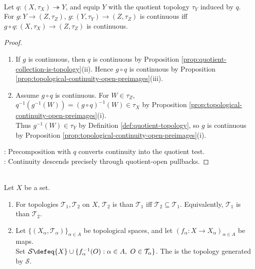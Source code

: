 \begin{proposition} \label{prop:quotient-topology-universal-property} \\
Let $q:(X,\tau_X)\twoheadrightarrow Y$, and equip $Y$ with the quotient topology $\tau_Y$ induced by $q$.\\
For $g:Y\to(Z,\tau_Z)$, $g:(Y,\tau_Y)\to(Z,\tau_Z)$ is continuous iff $g\circ q:(X,\tau_X)\to(Z,\tau_Z)$ is continuous.
\begin{proof}
\begin{enumerate}[label=\roman*.]
\setlength{\itemsep}{0pt}
\item[$(\Rightarrow)$] If $g$ is continuous, then $q$ is continuous by Proposition \ref{prop:quotient-collection-is-topology}(ii). Hence $g\circ q$ is continuous by Proposition \ref{prop:topological-continuity-open-preimages}(iii).
\item[$(\Leftarrow)$] Assume $g\circ q$ is continuous. For $W\in\tau_Z$, $q^{-1}(g^{-1}(W))=(g\circ q)^{-1}(W)\in\tau_X$ by Proposition \ref{prop:topological-continuity-open-preimages}(i).\\
Thus $g^{-1}(W)\in\tau_Y$ by Definition \ref{def:quotient-topology}, so $g$ is continuous by Proposition \ref{prop:topological-continuity-open-preimages}(i).
\end{enumerate}
: Precomposition with $q$ converts continuity into the quotient test.\\
: Continuity descends precisely through quotient-open pullbacks.
\end{proof}
\end{proposition}

\begin{definition} \label{def:weak-topology-induced-by-maps} \\
Let $X$ be a set.
\begin{enumerate}[label=(\roman*)]
\setlength{\itemsep}{0pt}
\item For topologies $\mathcal{T}_1,\mathcal{T}_2$ on $X$, $\mathcal{T}_2$ is  than $\mathcal{T}_1$ iff $\mathcal{T}_2\subseteq\mathcal{T}_1$. Equivalently, $\mathcal{T}_1$ is  than $\mathcal{T}_2$.
\item Let $\{(X_\alpha,\mathcal{T}_\alpha)\}_{\alpha\in A}$ be topological spaces, and let $(f_\alpha:X\to X_\alpha)_{\alpha\in A}$ be maps.\\
Set $\mathcal{S}\defeq\{X\}\cup\{f_\alpha^{-1}(O):\alpha\in A,\ O\in\mathcal{T}_\alpha\}$. The  is the topology generated by $\mathcal{S}$.
\end{enumerate}
\end{definition}


